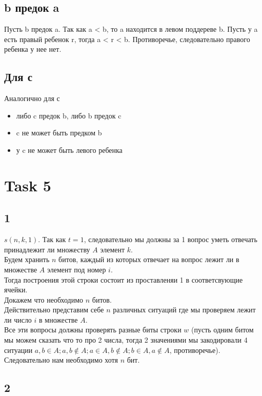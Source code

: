 \documentclass[12pt]{exam}
\begin{document}
\subsection*{b предок a}
Пусть b предок a.
Так как a < b, то a находится в левом поддереве b. 
Пусть у a есть правый ребенок r, тогда a < r < b. 
Противоречье, следовательно правого ребенка у нее нет.

\subsection*{Для с}
Аналогично для с 
\begin{itemize}
    \item либо c предок b, либо b предок c
    \item c не может быть предком b
    \item у c не может быть левого ребенка
\end{itemize}

\section*{Task 5}
\subsection*{1}
$s(n, k, 1)$. Так как $t = 1$, 
следовательно мы должны за 1 вопрос уметь отвечать принадлежит ли множеству $A$ элемент $k$. \\
Будем хранить $n$ битов, каждый из которых отвечает на вопрос лежит ли в множестве $A$ элемент под номер $i$.\\
Тогда построения этой строки состоит из проставленяи 1 в соответсвующие ячейки.\\
Докажем что необходимо $n$ битов. \\
Действительно представим себе $n$ различных ситуаций где мы проверяем лежит ли число $i$ в множестве $A$.\\
Все эти вопросы должны проверять разные биты строки $w$ 
(пусть одним битом мы можем сказать что то про 2 числа, тогда 2 значениями мы закодировали 4 ситуации 
$a, b \in A; a, b \notin A; a \in A, b \notin A; b \in A, a \notin A$, противоречье).
Следовательно нам необходимо хотя $n$ бит.

\subsection*{2}

\end{document}

